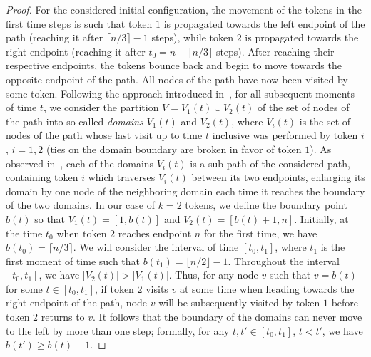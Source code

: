 \documentclass{article}[11pt,letter]
\begin{document}
\begin{proof}
For the considered initial configuration, the movement of the tokens in the first time steps is such that token $1$ is propagated towards the left endpoint of the path (reaching it after $\lceil n/3 \rceil -1$ steps), while token $2$ is propagated towards the right endpoint (reaching it after $t_0 = n-\lceil n/3 \rceil$ steps). After reaching their respective endpoints, the tokens bounce back and begin to move towards the opposite endpoint of the path. All nodes of the path have now been visited by some token. Following the approach introduced in~\cite{DBLP:conf/podc/KlasingKPS13}, for all subsequent moments of time $t$, we consider the partition $V = V_1(t) \cup V_2(t)$ of the set of nodes of the path into so called \emph{domains} $V_1(t)$ and $V_2(t)$, where $V_i(t)$ is the set of nodes of the path whose last visit up to time $t$ inclusive was performed by token $i$, $i=1,2$ (ties on the domain boundary are broken in favor of token $1$). As observed in~\cite{DBLP:conf/podc/KlasingKPS13}, each of the domains $V_i(t)$ is a sub-path of the considered path, containing token $i$ which traverses $V_i(t)$ between its two endpoints, enlarging its domain by one node of the neighboring domain each time it reaches the boundary of the two domains. In our case of $k=2$ tokens, we define the boundary point $b(t)$ so that $V_1(t) = [1,b(t)]$ and $V_2(t) = [b(t)+1, n]$. Initially, at the time $t_0$ when token $2$ reaches endpoint $n$ for the first time, we have $b(t_0) = \lceil n/3 \rceil$. We will consider the interval of time $[t_0, t_1]$, where $t_1$ is the first moment of time such that $b(t_1) = \lfloor n/2 \rfloor - 1$. Throughout the interval $[t_0, t_1]$, we have $|V_2(t)| > |V_1(t)|$. Thus, for any node $v$ such that $v = b(t)$ for some $t\in [t_0, t_1]$, if token $2$ visits $v$ at some time when heading towards the right endpoint of the path, node $v$ will be subsequently visited by token $1$ before token $2$ returns to $v$. It follows that the boundary of the domains can never move to the left by more than one step; formally, for any $t, t' \in [t_0, t_1]$, $t<t'$, we have $b(t') \geq b(t)-1$.


\end{proof}
\end{document}
